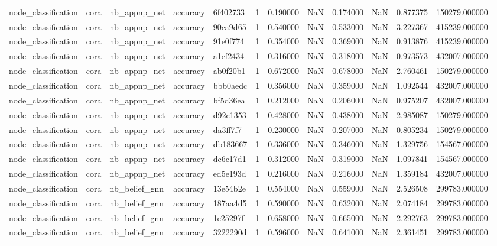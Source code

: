 \begin{tabular}{lllllrrrrrrr}
node_classification & cora & nb_appnp_net & accuracy & 6f402733 & 1 & 0.190000 & NaN & 0.174000 & NaN & 0.877375 & 150279.000000 \\
node_classification & cora & nb_appnp_net & accuracy & 90ca9d65 & 1 & 0.540000 & NaN & 0.533000 & NaN & 3.227367 & 415239.000000 \\
node_classification & cora & nb_appnp_net & accuracy & 91e0f774 & 1 & 0.354000 & NaN & 0.369000 & NaN & 0.913876 & 415239.000000 \\
node_classification & cora & nb_appnp_net & accuracy & a1ef2434 & 1 & 0.316000 & NaN & 0.318000 & NaN & 0.973573 & 432007.000000 \\
node_classification & cora & nb_appnp_net & accuracy & ab0f20b1 & 1 & 0.672000 & NaN & 0.678000 & NaN & 2.760461 & 150279.000000 \\
node_classification & cora & nb_appnp_net & accuracy & bbb0aedc & 1 & 0.356000 & NaN & 0.359000 & NaN & 1.092544 & 432007.000000 \\
node_classification & cora & nb_appnp_net & accuracy & bf5d36ea & 1 & 0.212000 & NaN & 0.206000 & NaN & 0.975207 & 432007.000000 \\
node_classification & cora & nb_appnp_net & accuracy & d92c1353 & 1 & 0.428000 & NaN & 0.438000 & NaN & 2.985087 & 150279.000000 \\
node_classification & cora & nb_appnp_net & accuracy & da3ff7f7 & 1 & 0.230000 & NaN & 0.207000 & NaN & 0.805234 & 150279.000000 \\
node_classification & cora & nb_appnp_net & accuracy & db183667 & 1 & 0.336000 & NaN & 0.346000 & NaN & 1.329756 & 154567.000000 \\
node_classification & cora & nb_appnp_net & accuracy & dc6c17d1 & 1 & 0.312000 & NaN & 0.319000 & NaN & 1.097841 & 154567.000000 \\
node_classification & cora & nb_appnp_net & accuracy & ed5e193d & 1 & 0.216000 & NaN & 0.216000 & NaN & 1.359184 & 432007.000000 \\
node_classification & cora & nb_belief_gnn & accuracy & 13e54b2e & 1 & 0.554000 & NaN & 0.559000 & NaN & 2.526508 & 299783.000000 \\
node_classification & cora & nb_belief_gnn & accuracy & 187aa4d5 & 1 & 0.590000 & NaN & 0.632000 & NaN & 2.074184 & 299783.000000 \\
node_classification & cora & nb_belief_gnn & accuracy & 1e25297f & 1 & 0.658000 & NaN & 0.665000 & NaN & 2.292763 & 299783.000000 \\
node_classification & cora & nb_belief_gnn & accuracy & 3222290d & 1 & 0.596000 & NaN & 0.641000 & NaN & 2.361451 & 299783.000000 \\

\end{tabular}

